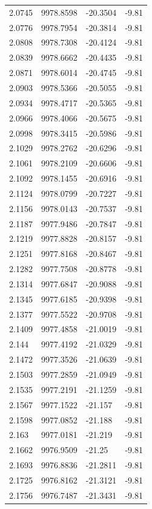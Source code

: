 \begin{table}[H]
\begin{tabular}{llll}
2.0745 & 9978.8598 & -20.3504 & -9.81 \\
2.0776 & 9978.7954 & -20.3814 & -9.81 \\
2.0808 & 9978.7308 & -20.4124 & -9.81 \\
2.0839 & 9978.6662 & -20.4435 & -9.81 \\
2.0871 & 9978.6014 & -20.4745 & -9.81 \\
2.0903 & 9978.5366 & -20.5055 & -9.81 \\
2.0934 & 9978.4717 & -20.5365 & -9.81 \\
2.0966 & 9978.4066 & -20.5675 & -9.81 \\
2.0998 & 9978.3415 & -20.5986 & -9.81 \\
2.1029 & 9978.2762 & -20.6296 & -9.81 \\
2.1061 & 9978.2109 & -20.6606 & -9.81 \\
2.1092 & 9978.1455 & -20.6916 & -9.81 \\
2.1124 & 9978.0799 & -20.7227 & -9.81 \\
2.1156 & 9978.0143 & -20.7537 & -9.81 \\
2.1187 & 9977.9486 & -20.7847 & -9.81 \\
2.1219 & 9977.8828 & -20.8157 & -9.81 \\
2.1251 & 9977.8168 & -20.8467 & -9.81 \\
2.1282 & 9977.7508 & -20.8778 & -9.81 \\
2.1314 & 9977.6847 & -20.9088 & -9.81 \\
2.1345 & 9977.6185 & -20.9398 & -9.81 \\
2.1377 & 9977.5522 & -20.9708 & -9.81 \\
2.1409 & 9977.4858 & -21.0019 & -9.81 \\
2.144 & 9977.4192 & -21.0329 & -9.81 \\
2.1472 & 9977.3526 & -21.0639 & -9.81 \\
2.1503 & 9977.2859 & -21.0949 & -9.81 \\
2.1535 & 9977.2191 & -21.1259 & -9.81 \\
2.1567 & 9977.1522 & -21.157 & -9.81 \\
2.1598 & 9977.0852 & -21.188 & -9.81 \\
2.163 & 9977.0181 & -21.219 & -9.81 \\
2.1662 & 9976.9509 & -21.25 & -9.81 \\
2.1693 & 9976.8836 & -21.2811 & -9.81 \\
2.1725 & 9976.8162 & -21.3121 & -9.81 \\
2.1756 & 9976.7487 & -21.3431 & -9.81 \\

\end{tabular}
\end{table}
